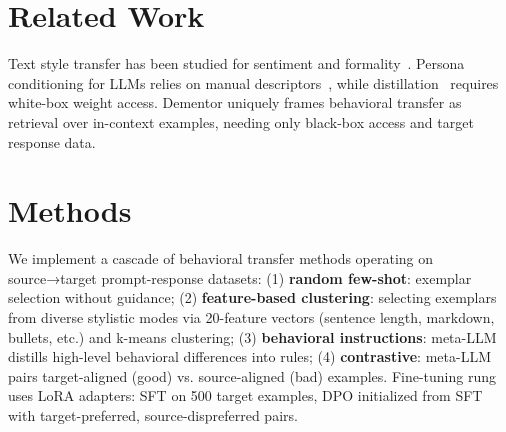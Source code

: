 \documentclass{article}
\begin{document}



\section{Related Work}

Text style transfer has been studied for sentiment and formality~\cite{jin2022deep}. Persona conditioning for LLMs relies on manual descriptors~\cite{salemi2024lamp}, while distillation~\cite{hinton2015distilling} requires white-box weight access. Dementor uniquely frames behavioral transfer as retrieval over in-context examples, needing only black-box access and target response data.

\section{Methods}

We implement a cascade of behavioral transfer methods operating on source→target prompt-response datasets: (1) \textbf{random few-shot}: exemplar selection without guidance; (2) \textbf{feature-based clustering}: selecting exemplars from diverse stylistic modes via 20-feature vectors (sentence length, markdown, bullets, etc.) and k-means clustering; (3) \textbf{behavioral instructions}: meta-LLM distills high-level behavioral differences into rules; (4) \textbf{contrastive}: meta-LLM pairs target-aligned (good) vs. source-aligned (bad) examples. Fine-tuning rung uses LoRA adapters: SFT on 500 target examples, DPO initialized from SFT with target-preferred, source-dispreferred pairs.
\end{document}
